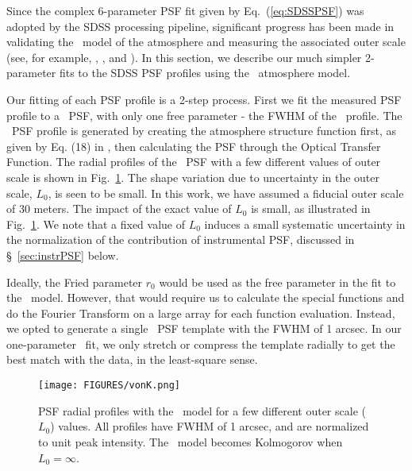 

Since the complex 6-parameter PSF fit given by Eq.~(\ref{eq:SDSSPSF}) was adopted by 
the SDSS processing pipeline, significant progress has been made in validating the 
\vk~model of the atmosphere and measuring the associated outer
scale (see, for example, \citealt{Tokovinin2002}, \citealt{Boccas2004}, and \citealt{MartinezMessenger}).
In this section, we describe our much simpler 2-parameter fits to the SDSS PSF
profiles using the \vk~atmosphere model.

Our fitting of each PSF profile is a 2-step process. First we fit the
measured PSF profile to a \vk~PSF, with only one free parameter -
the FWHM of the \vk~profile.  The \vk~PSF profile is generated by creating the atmosphere
structure function first, as given by Eq. (18) in \cite{Tokovinin2002}, then calculating the
PSF through the Optical Transfer Function. 
The radial profiles of the \vk~PSF with a few different values of
outer scale is shown in Fig.~\ref{fig:vonK}.
The shape variation due to uncertainty in the outer scale, $L_0$, is seen to
be small. In this work, we have assumed a fiducial outer scale of 30 meters.
The impact of the exact value of $L_0$ is small, as illustrated in Fig.~\ref{fig:vonK}. 
We note that a fixed value of $L_0$ induces a small systematic uncertainty in 
the normalization of the contribution of instrumental PSF, discussed in \S~\ref{sec:instrPSF} 
below. 

Ideally, the Fried parameter $r_0$ would be used as the free
parameter in the fit to the \vk~model. However, 
that would require us to calculate the special functions and do the
Fourier Transform on a large array for each function evaluation.
Instead, we opted to generate a single \vk~PSF template with the FWHM of 
1 arcsec. In our one-parameter \vk~fit, we only stretch or compress
the template radially to get the best match with the data, in the
least-square sense.

\begin{figure}[ht]
\centering
\texttt{[image: FIGURES/vonK.png]}
\vskip -0.2in 
\caption{PSF radial profiles with the \vk~model for a few different
  outer scale ($L_0$) values. All profiles have FWHM of 1 arcsec, and
  are normalized to unit peak intensity. The \vk~model becomes
  Kolmogorov when $L_0 = \infty$.
\label{fig:vonK}}
\end{figure}




